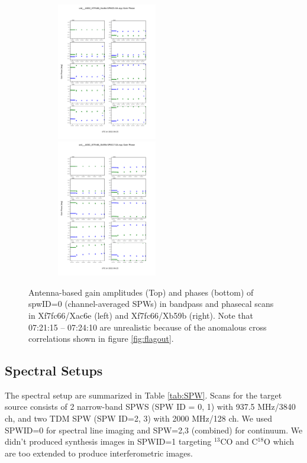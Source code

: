 \documentclass[a4paper, 10pt]{scrartcl}
\begin{document}
\begin{figure}[h]
	\includegraphics[width=7cm,height=6cm]{GA_uid___A002_Xf7fc66_Xac6e-SPW25-phs.pdf} \includegraphics[width=7cm,height=6cm]{GA_uid___A002_Xf7fc66_Xb59b-SPW17-phs.pdf}
	\caption{Antenna-based gain amplitudes (Top) and phases (bottom) of spwID=0 (channel-averaged SPWs) in bandpass and phasecal scans in Xf7fc66/Xac6e (left) and Xf7fc66/Xb59b (right). Note that 07:21:15 -- 07:24:10 are unrealistic because of the anomalous cross correlations shown in figure \ref{fig:flagout}.}\label{fig:gainamp}
\end{figure}


\normalsize
\subsection{Spectral Setups}
The spectral setup are summarized in Table \ref{tab:SPW}. Scans for the target source consists of 2 narrow-band SPWS (SPW ID = 0, 1) with 937.5 MHz/3840 ch, and two TDM SPW (SPW ID=2, 3) with 2000 MHz/128 ch.
We used SPWID=0 for spectral line imaging and SPW=2,3 (combined) for continuum.
We didn't produced synthesis images in SPWID=1 targeting $^{13}$CO and C$^{18}$O which are too extended to produce interferometric images.
\end{document}
